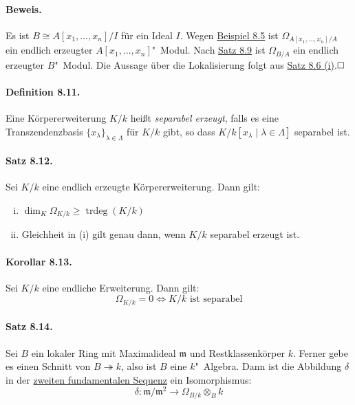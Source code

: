 \documentclass[11pt,b5paper,openany]{memoir}
\def \qed {$\hfill\square$}
\begin{document}
\paragraph{Beweis.} Es ist $B \cong A[x_1,\ldots,x_n]/I$ für ein Ideal $I$. Wegen \hyperref[8.5]{Beispiel 8.5} ist $\Omega_{A[x_1,\ldots,x_n]/A}$ ein endlich erzeugter $A[x_1,\ldots,x_n]$"~Modul. Nach \hyperref[8.9]{Satz 8.9} ist $\Omega_{B/A}$ ein endlich erzeugter $B$"~Modul. Die Aussage über die Lokalisierung folgt aus \hyperref[8.6]{Satz 8.6 (i)}.\qed

\paragraph{Definition 8.11.}\label{8.11} Eine Körpererweiterung $K/k$ heißt \textit{separabel erzeugt}, falls es eine Transzendenzbasis $\{x_\lambda\}_{\lambda\in\Lambda}$ für $K/k$ gibt, so dass $K/k[x_\lambda\mid \lambda\in\Lambda]$ separabel ist.

\paragraph{Satz 8.12.}\label{8.12} Sei $K/k$ eine endlich erzeugte Körpererweiterung. Dann gilt:
\begin{enumerate}[(i)]
\item $\dim_K\Omega_{K/k}\geq \operatorname{trdeg}(K/k)$
\item Gleichheit in (i) gilt genau dann, wenn $K/k$ separabel erzeugt ist.
\end{enumerate}

\paragraph{Korollar 8.13.}\label{8.13} Sei $K/k$ eine endliche Erweiterung. Dann gilt:
\[\Omega_{K/k}=0\iff K/k\text{ ist separabel} \]

\paragraph{Satz 8.14.}\label{8.14} Sei $B$ ein lokaler Ring mit Maximalideal $\mathfrak{m}$ und Restklassenkörper $k$. Ferner gebe es einen Schnitt von $B\twoheadrightarrow k$, also ist $B$ eine $k$"~Algebra. Dann ist die Abbildung $\delta$ in der \hyperref[8.9]{zweiten fundamentalen Sequenz} ein Isomorphismus:
\[\delta:\mathfrak{m}/\mathfrak{m}^2\to \Omega_{B/k}\otimes_B k \]
\end{document}
